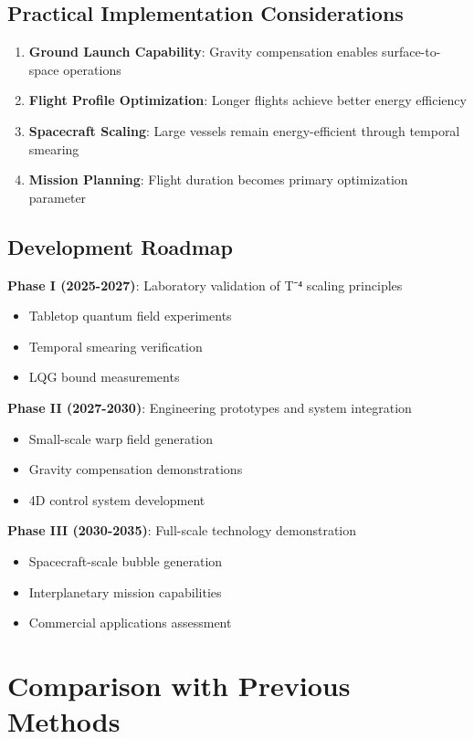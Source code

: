 \documentclass[12pt,a4paper]{article}
\begin{document}
\subsection{Practical Implementation Considerations}

\begin{enumerate}
\item \textbf{Ground Launch Capability}: Gravity compensation enables surface-to-space operations
\item \textbf{Flight Profile Optimization}: Longer flights achieve better energy efficiency
\item \textbf{Spacecraft Scaling}: Large vessels remain energy-efficient through temporal smearing
\item \textbf{Mission Planning}: Flight duration becomes primary optimization parameter
\end{enumerate}

\subsection{Development Roadmap}

\textbf{Phase I (2025-2027)}: Laboratory validation of T⁻⁴ scaling principles
\begin{itemize}
\item Tabletop quantum field experiments
\item Temporal smearing verification
\item LQG bound measurements
\end{itemize}

\textbf{Phase II (2027-2030)}: Engineering prototypes and system integration
\begin{itemize}
\item Small-scale warp field generation
\item Gravity compensation demonstrations
\item 4D control system development
\end{itemize}

\textbf{Phase III (2030-2035)}: Full-scale technology demonstration
\begin{itemize}
\item Spacecraft-scale bubble generation
\item Interplanetary mission capabilities
\item Commercial applications assessment
\end{itemize}

\section{Comparison with Previous Methods}
\end{document}
